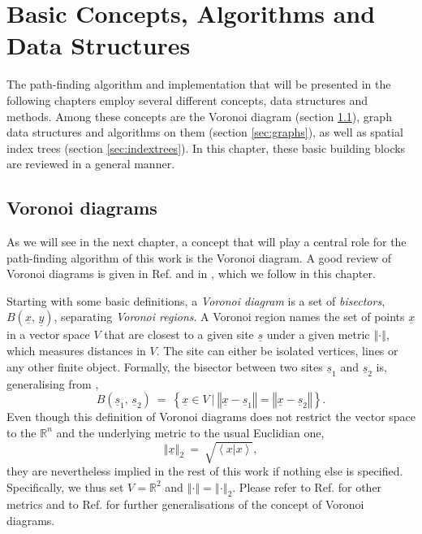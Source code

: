 %
%

\chapter{Basic Concepts, Algorithms and Data Structures}
\label{ch:algos}
The  path-finding algorithm and implementation that will be presented in the following chapters
employ several different concepts, data structures and methods.
Among these concepts are the Voronoi diagram (section \ref{sec:voro}),
graph data structures and algorithms on them (section \ref{sec:graphs}),
as well as spatial index trees (section \ref{sec:indextrees}).
In this chapter, these basic building blocks are reviewed in a general manner.



\section{Voronoi diagrams}
\label{sec:voro}
As we will see in the next chapter, a concept that will play a central role for the path-finding 
algorithm of this work is the Voronoi diagram.
A good review of Voronoi diagrams is given in Ref. \cite[Ch. 7, pp. 147-171]{Berg2008} 
and in \cite[Ch. 5, pp. 209f]{FUH_geo2020}, which we follow in this chapter.

Starting with some basic definitions, a \textit{Voronoi diagram} is a set of 
\textit{bisectors}, $B\left(\underline{x},\, \underline{y}\right)$, separating \textit{Voronoi regions}.
A Voronoi region names the set of points $\underline{x}$ in a vector space $V$ that are closest to 
a given site $\underline{s}$ under a given metric $\left\Vert \cdot \right\Vert$, which measures distances in $V$.
The site can either be isolated vertices, lines or any other finite object.
Formally, the bisector between two sites $\underline{s}_1$ and $\underline{s}_2$ is, 
generalising from \cite[p. 140]{Icking2001},
\begin{equation}
	B\left(\underline{s}_1,\, \underline{s}_2\right)\ =\ \left\{ \underline{x} \in V \ |\ 
		\left\Vert \underline{x} - \underline{s}_1 \right\Vert = \left\Vert \underline{x} - \underline{s}_2 \right\Vert \right\}.
	\label{eq:bisector}
\end{equation}
Even though this definition of Voronoi diagrams does not restrict the vector space to the $\mathbb{R}^n$ 
and the underlying metric to the usual Euclidian one, 
\begin{equation}
	\left\Vert \underline{x} \right\Vert_2 \ =\ \sqrt{\left<x | x \right>},
\end{equation}
they are nevertheless implied in the rest of this work if nothing else is specified.
Specifically, we thus set $V = \mathbb{R}^2$ and $\left\Vert \cdot \right\Vert = \left\Vert \cdot \right\Vert_2$. 
Please refer to Ref. \cite{Icking2001} for other metrics and to Ref. \cite{Boissonnat2006} for further 
generalisations of the concept of Voronoi diagrams.



